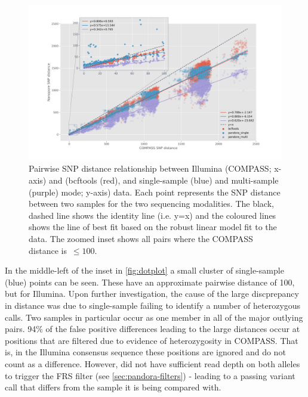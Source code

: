\begin{figure}
\begin{center}
\includegraphics[width=0.90\columnwidth]{Chapter2/Figs/combined-dotplots.png}
\caption{{Pairwise SNP distance relationship between Illumina (COMPASS; x-axis)
and \ont{} (bcftools (red), and \pandora{} single-sample (blue) and multi-sample (purple) mode; y-axis) data. Each point represents the SNP
distance between two samples for the two sequencing modalities. The black, dashed line shows the identity
line (i.e. y=x) and the coloured lines shows the line of best fit based on
the robust linear model fit to the data. The zoomed inset shows all
pairs where the COMPASS distance is~\(\le100\).
{\label{fig:dotplot}}%
}}
\end{center}
\end{figure}

In the middle-left of the inset in \autoref{fig:dotplot} a small cluster of \pandora{} single-sample (blue) points can be seen. These have an approximate pairwise \ont{} distance of 100, but  for Illumina. Upon further investigation, the cause of the large discprepancy in distance was due to \pandora{} single-sample failing to identify a number of heterozygous calls. Two samples in particular occur as one member in all of the major outlying pairs. 94\% of the false positive differences leading to the large \ont{} distances occur at positions that are filtered due to evidence of heterozygosity in COMPASS. That is, in the Illumina consensus sequence these positions are ignored and do not count as a difference. However, \pandora{} did not have sufficient read depth on both alleles to trigger the FRS filter (see \autoref{sec:pandora-filters}) - leading to a passing variant call that differs from the sample it is being compared with.


